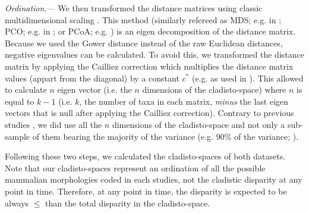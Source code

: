 \documentclass[12pt,letterpaper]{article}
\renewcommand{\subsubsection}[1]{%
\vspace{2ex}
\noindent
\textit{#1.}---}
\begin{document}
\subsubsection{Ordination}
We then transformed the distance matrices using classic multidimensional scaling \citep{torgerson1965multidimensional,GOWER01121966,cailliez1983analytical}.
This method (similarly refereed as MDS; e.g. in \citealt{DonohueDim}; PCO; e.g. in \citealt{Brusatte2015}; or PCoA; e.g. \citealt{paradisape:2004}) is an eigen decomposition of the distance matrix.
Because we used the Gower distance instead of the raw Euclidean distances, negative eigenvalues can be calculated.
To avoid this, we transformed the distance matrix by applying the Cailliez correction \citep{cailliez1983analytical} which multiplies the distance matrix values (appart from the diagonal) by a constant $c^*$ (e.g. as used in \citealt{toljagictriassic-jurassic2013}).
This allowed to calculate $n$ eigen vector (i.e. the $n$ dimensions of the cladisto-space) where $n$ is equal to $k-1$ (i.e. $k$, the number of taxa in each matrix, \textit{minus} the last eigen vectors that is null after applying the Cailliez correction).
Contrary to previous studies \citep{brusatte50,cisneros2010,prentice2011,anderson2012using,Hughes20082013,bentonmodels2014}, we did use all the $n$ dimensions of the cladisto-space and not only a sub-sample of them bearing the majority of the variance (e.g. 90\% of the variance; \citealt{Brusatte12092008,toljagictriassic-jurassic2013}).

Following these two steps, we calculated the cladisto-spaces of both datasets.
Note that our cladisto-spaces represent an ordination of all the possible mammalian morphologies coded in each studies, not the cladistic disparity at any point in time.
Therefore, at any point in time, the disparity is expected to be always $\leq$ than the total disparity in the cladisto-space.
\end{document}
